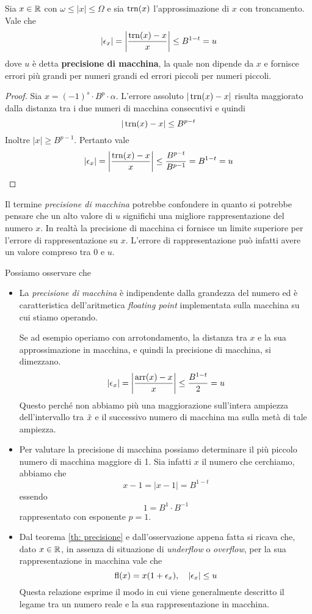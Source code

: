 \begin{theorem}\label{th: precisione}
	Sia $x \in \mathbb{R}$ con $\omega \leq |x| \leq \Omega$ e sia $\operatorname{trn}(x)$ l'approssimazione di $x$ con troncamento.
	Vale che
	\[ |\epsilon_x| = \left| \frac{\operatorname{trn}(x) - x}{x} \right| \leq B^{1-t} = u \]
	dove $u$ è detta \textbf{precisione di macchina}, la quale non dipende da $x$ e fornisce errori più grandi
	per numeri grandi ed errori piccoli per numeri piccoli.
	\begin{proof}
		Sia $x = (-1)^s \cdot B^p \cdot \alpha$. L'errore assoluto $|\operatorname{trn}(x) - x|$ risulta maggiorato dalla
		distanza tra i due numeri di macchina consecutivi e quindi
		\[ |\operatorname{trn}(x) - x| \leq B^{p-t} \]
		Inoltre $|x| \geq B^{p-1}$. Pertanto vale
		\[ |\epsilon_x| = \left| \frac{\operatorname{trn}(x) - x}{x} \right| \leq \frac{B^{p-t}}{B^{p-1}} = B^{1-t} = u \]
	\end{proof}
\end{theorem}

Il termine \emph{precisione di macchina} potrebbe confondere in quanto si potrebbe pensare che un alto valore
di $u$ significhi una migliore rappresentazione del numero $x$. In realtà la precisione di macchina ci fornisce
un limite superiore per l'errore di rappresentazione su $x$. L'errore di rappresentazione può infatti avere un
valore compreso tra 0 e $u$.

\begin{observation}
	Possiamo osservare che
	\begin{itemize}
		\item La \emph{precisione di macchina} è indipendente dalla grandezza del numero ed è caratteristica
		      dell'aritmetica \emph{floating point} implementata sulla macchina su cui stiamo operando.

		      Se ad esempio operiamo con arrotondamento, la distanza tra $x$ e la sua approssimazione in
		      macchina, e quindi la precisione di macchina, si dimezzano.
		      \[ |\epsilon_x| = \left| \frac{\operatorname{arr}(x) - x}{x} \right| \leq \frac{B^{1 - t}}{2} = u \]
		      Questo perché non abbiamo più una
		      maggiorazione sull'intera ampiezza dell'intervallo tra $\tilde{x}$ e il successivo numero di
		      macchina ma sulla metà di tale ampiezza.
		\item Per valutare la precisione di macchina possiamo determinare il più piccolo numero di macchina
		      maggiore di 1. Sia infatti $x$ il numero che cerchiamo, abbiamo che
		      \[ x - 1 = |x - 1| = B^{1-t} \]
		      essendo
		      \[ 1 = B^1 \cdot B^{-1} \]
		      rappresentato con esponente $p = 1$.
		\item Dal teorema \ref{th: precisione} e dall'osservazione appena fatta si ricava che, dato $x \in \mathbb{R}$,
		      in assenza di situazione di \emph{underflow} o \emph{overflow}, per la sua rappresentazione in
		      macchina vale che
		      \[ \operatorname{fl}(x) = x (1 + \epsilon_x), \quad |\epsilon_x| \leq u \]
		      Questa relazione esprime il modo in cui viene generalmente descritto il legame tra un numero reale
		      e la sua rappresentazione in macchina.
	\end{itemize}
\end{observation}

